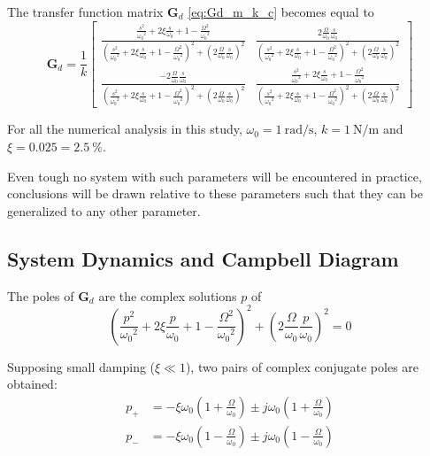 \documentclass{ISMA_USD2020}
\begin{document}
The transfer function matrix \(\bm{G}_d\) \eqref{eq:Gd_m_k_c} becomes equal to
\begin{equation}
\label{eq:Gd_w0_xi_k}
\bm{G}_{d} =
  \frac{1}{k}
  \begin{bmatrix}
    \frac{\frac{s^2}{{\omega_0}^2} + 2 \xi \frac{s}{\omega_0} + 1 - \frac{{\Omega}^2}{{\omega_0}^2}}{\left( \frac{s^2}{{\omega_0}^2} + 2 \xi \frac{s}{\omega_0} + 1 - \frac{{\Omega}^2}{{\omega_0}^2} \right)^2 + \left( 2 \frac{\Omega}{\omega_0} \frac{s}{\omega_0} \right)^2} & \frac{2 \frac{\Omega}{\omega_0} \frac{s}{\omega_0}}{\left( \frac{s^2}{{\omega_0}^2} + 2 \xi \frac{s}{\omega_0} + 1 - \frac{{\Omega}^2}{{\omega_0}^2} \right)^2 + \left( 2 \frac{\Omega}{\omega_0} \frac{s}{\omega_0} \right)^2} \\
    \frac{- 2 \frac{\Omega}{\omega_0} \frac{s}{\omega_0}}{\left( \frac{s^2}{{\omega_0}^2} + 2 \xi \frac{s}{\omega_0} + 1 - \frac{{\Omega}^2}{{\omega_0}^2} \right)^2 + \left( 2 \frac{\Omega}{\omega_0} \frac{s}{\omega_0} \right)^2} & \frac{\frac{s^2}{{\omega_0}^2} + 2 \xi \frac{s}{\omega_0} + 1 - \frac{{\Omega}^2}{{\omega_0}^2}}{\left( \frac{s^2}{{\omega_0}^2} + 2 \xi \frac{s}{\omega_0} + 1 - \frac{{\Omega}^2}{{\omega_0}^2} \right)^2 + \left( 2 \frac{\Omega}{\omega_0} \frac{s}{\omega_0} \right)^2}
  \end{bmatrix}
\end{equation}

For all the numerical analysis in this study, \(\omega_0 = \SI{1}{\radian\per\second}\), \(k = \SI{1}{\newton\per\meter}\) and \(\xi = 0.025 = \SI{2.5}{\percent}\).

Even tough no system with such parameters will be encountered in practice, conclusions will be drawn relative to these parameters such that they can be generalized to any other parameter.

\subsection{System Dynamics and Campbell Diagram}
\label{sec:orgd6473a3}
The poles of \(\bm{G}_d\) are the complex solutions \(p\) of
\begin{equation}
  \left( \frac{p^2}{{\omega_0}^2} + 2 \xi \frac{p}{\omega_0} + 1 - \frac{{\Omega}^2}{{\omega_0}^2} \right)^2 + \left( 2 \frac{\Omega}{\omega_0} \frac{p}{\omega_0} \right)^2 = 0
\end{equation}

Supposing small damping (\(\xi \ll 1\)), two pairs of complex conjugate poles are obtained:
\begin{subequations}
\label{eq:pole_values}
  \begin{align}
    p_{+} &= - \xi \omega_0 \left( 1 + \frac{\Omega}{\omega_0} \right) \pm j \omega_0 \left( 1 + \frac{\Omega}{\omega_0} \right) \\
    p_{-} &= - \xi \omega_0 \left( 1 - \frac{\Omega}{\omega_0} \right) \pm j \omega_0 \left( 1 - \frac{\Omega}{\omega_0} \right)
  \end{align}
\end{subequations}
\end{document}
